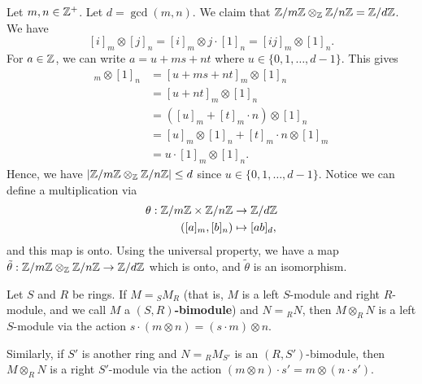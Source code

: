 \begin{exmp}{}
    Let $m, n \in \mathbb{Z}^+$. Let $d = \gcd(m, n)$. We claim that 
    $\mathbb{Z}/m\mathbb{Z} \otimes_{\mathbb{Z}} \mathbb{Z}/n\mathbb{Z} = \mathbb{Z}/d\mathbb{Z}$. We have 
    \[ [i]_m \otimes [j]_n = [i]_m \otimes j \cdot [1]_n 
    = [ij]_m \otimes [1]_n. \] 
    For $a \in \mathbb{Z}$, we can write $a = u + ms + nt$ where 
    $u \in \{0, 1, \dots, d-1\}$. This gives 
    \begin{align*} 
        [ij]_m \otimes [1]_n 
        &= [u + ms + nt]_m \otimes [1]_n \\
        &= [u + nt]_m \otimes [1]_n \\
        &= ([u]_m + [t]_m \cdot n) \otimes [1]_n \\
        &= [u]_m \otimes [1]_n + [t]_m \cdot n \otimes [1]_m \\
        &= u \cdot [1]_m \otimes [1]_n. 
    \end{align*}
    Hence, we have $|\mathbb{Z}/m\mathbb{Z} \otimes_{\mathbb{Z}} \mathbb{Z}/n\mathbb{Z}| \leq d$ since 
    $u \in \{0, 1, \dots, d-1\}$. 
    Notice we can define a multiplication via 
    \begin{align*}
        \theta : \mathbb{Z}/m\mathbb{Z} \times \mathbb{Z}/n\mathbb{Z} &\to \mathbb{Z}/d\mathbb{Z} \\ 
        ([a]_m, [b]_n) &\mapsto [ab]_d, 
    \end{align*}
    and this map is onto. Using the universal property, we have a
    map $\tilde\theta : \mathbb{Z}/m\mathbb{Z} \otimes_{\mathbb{Z}} \mathbb{Z}/n\mathbb{Z} \to \mathbb{Z}/d\mathbb{Z}$ which is
    onto, and $\tilde\theta$ is an isomorphism. 
    \begin{center}
    \end{center}
\end{exmp}

\begin{remark}{}
    Let $S$ and $R$ be rings. If $M = {}_S M_R$ (that is, $M$ is a 
    left $S$-module and right $R$-module, and we call $M$ a 
    \textbf{$(S, R)$-bimodule}) and $N = {}_R N$, then 
    $M \otimes_R N$ is a left $S$-module via the action
    $s \cdot (m \otimes n) = (s \cdot m) \otimes n$. 
    
    Similarly, if $S'$ is another ring and $N = {}_R M_{S'}$ is an 
    $(R, S')$-bimodule, then $M \otimes_R N$ is a right $S'$-module via the 
    action $(m \otimes n) \cdot s' = m \otimes (n \cdot s')$. 
\end{remark}

